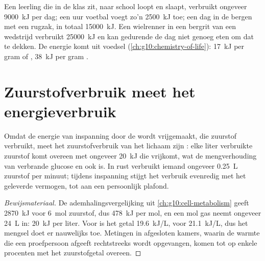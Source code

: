 \begin{example}[Dagbudgetten]\label{ex:g10:exercise-and-energy:budgets}
Een leerling die in de klas zit, naar school loopt en slaapt, verbruikt
ongeveer \qty{9000}{kJ} per dag; een uur voetbal voegt zo'n
\qty{2500}{kJ} toe; een dag in de bergen met een rugzak, in totaal
\qty{15000}{kJ}. Een wielrenner in een bergrit van een wedstrijd
verbruikt \qty{25000}{kJ} en kan gedurende de dag niet genoeg eten om
dat te dekken. De energie komt uit voedsel
(\cref{ch:g10:chemistry-of-life}): \qty{17}{kJ} per gram  of
, \qty{38}{kJ} per gram .
\end{example}

\section{Zuurstofverbruik meet het energieverbruik}

\begin{proposition}\label{prop:g10:exercise-and-energy:oxygen}
Omdat de energie van inspanning door de  wordt vrijgemaakt,
die zuurstof verbruikt, meet het zuurstofverbruik van het lichaam zijn
: elke liter verbruikte zuurstof komt overeen met
ongeveer \qty{20}{kJ} die vrijkomt, wat de mengverhouding van verbrande
glucose en  ook is. In rust verbruikt iemand ongeveer
\qty{0.25}{L} zuurstof per minuut; tijdens inspanning stijgt het verbruik
evenredig met het geleverde vermogen, tot aan een persoonlijk plafond.
\end{proposition}
\begin{proof}[Bewijsmateriaal]
De ademhalingsvergelijking uit \cref{ch:g10:cell-metabolism} geeft
\qty{2870}{kJ} voor \qty{6}{mol} zuurstof, dus \qty{478}{kJ} per mol, en
een mol gas neemt ongeveer \qty{24}{L} in: \qty{20}{kJ} per liter. Voor
 is het getal \qty{19.6}{kJ/L}, voor 
\qty{21.1}{kJ/L}, dus het mengsel doet er nauwelijks toe. Metingen in
afgesloten kamers, waarin de warmte die een proefpersoon afgeeft
rechtstreeks wordt opgevangen, komen tot op enkele procenten met het
zuurstofgetal overeen.
\end{proof}

